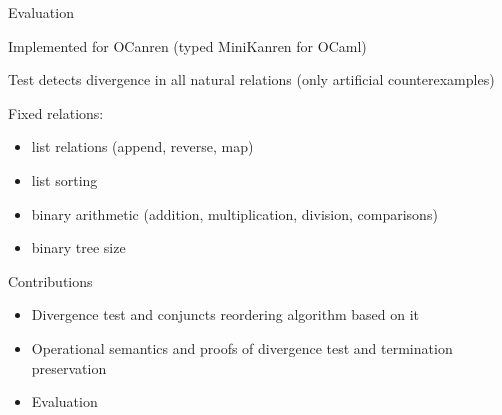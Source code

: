 \documentclass{beamer}
\theoremstyle{definition}
\theoremstyle{plain} %
\begin{document}
\begin{frame}{Evaluation}

Implemented for OCanren (typed MiniKanren for OCaml)

 \vskip8mm

Test detects divergence in all natural relations (only artificial counterexamples)

 \vskip8mm

Fixed relations:
 \begin{itemize}
 \item list relations (append, reverse, map)
 \item list sorting
 \item binary arithmetic (addition, multiplication, division, comparisons)
 \item binary tree size
 \end{itemize}
 
\end{frame}

\begin{frame}{Contributions}

\begin{itemize}
 \item Divergence test and conjuncts reordering algorithm based on it
 \vskip1cm
 \item Operational semantics and proofs of divergence test and termination preservation
 \vskip1cm
 \item Evaluation
\end{itemize}
 
\end{frame}
\end{document}
